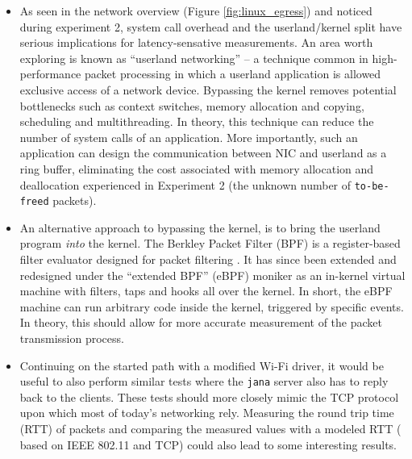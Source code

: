 \begin{itemize}

\item As seen in the network overview (Figure \ref{fig:linux_egress}) and
noticed during experiment 2, system call overhead and the userland/kernel
split have serious implications for latency-sensative measurements. An area
worth exploring is known as ``userland networking'' -- a technique common in
high-performance packet processing in which a userland application is allowed
exclusive access of a network device. Bypassing the kernel removes potential
bottlenecks such as context switches, memory allocation and copying,
scheduling and multithreading. In theory, this technique can reduce the number
of system calls of an application. More importantly, such an application can
design the communication between NIC and userland as a ring buffer,
eliminating the cost associated with memory allocation and deallocation
experienced in Experiment 2 (the unknown number of \texttt{to-be-freed}
packets).

\item An alternative approach to bypassing the kernel, is to bring the
userland program \emph{into} the kernel. The Berkley Packet Filter (BPF) is a
register-based filter evaluator designed for packet filtering
\cite{10.5555/1267303.1267305}. It has since been extended and redesigned
under the ``extended BPF'' (eBPF) moniker as an in-kernel virtual machine with
filters, taps and hooks all over the kernel. In short, the eBPF machine can
run arbitrary code inside the kernel, triggered by specific events. In theory,
this should allow for more accurate measurement of the packet transmission
process.


\item Continuing on the started path with a modified Wi-Fi driver, it would be
useful to also perform similar tests where the \texttt{jana} server also has
to reply back to the clients. These tests should more closely mimic the TCP
protocol upon which most of today's networking rely. Measuring the round trip
time (RTT) of packets and comparing the measured values with a modeled RTT (
based on IEEE 802.11 and TCP) could also lead to some interesting results.



\end{itemize}
